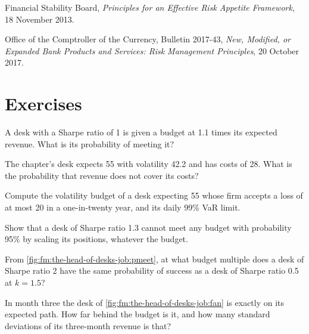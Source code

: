 \begin{omsources}
\item Financial Stability Board, \emph{Principles for an Effective Risk Appetite Framework}, 18 November 2013.
\item Office of the Comptroller of the Currency, Bulletin 2017-43, \emph{New, Modified, or Expanded Bank Products and Services: Risk Management
Principles}, 20 October 2017.
\end{omsources}

\section{Exercises}

\begin{exercise}[$\star$]\label{exo:fm:the-head-of-desks-job:1}
A desk with a Sharpe ratio of 1 is given a budget at 1.1 times its expected revenue. What is its probability of meeting it?
\end{exercise}

\begin{exercise}[$\star$]\label{exo:fm:the-head-of-desks-job:2}
The chapter's desk expects 55 with volatility 42.2 and has costs of 28. What is the probability that revenue does not cover its costs?
\end{exercise}

\begin{exercise}[$\star$]\label{exo:fm:the-head-of-desks-job:3}
Compute the volatility budget of a desk expecting 55 whose firm accepts a loss of at most 20 in a one-in-twenty year, and its daily 99\% VaR limit.
\end{exercise}

\begin{exercise}[$\star\star$]\label{exo:fm:the-head-of-desks-job:4}
Show that a desk of Sharpe ratio 1.3 cannot meet any budget with probability 95\% by scaling its positions, whatever the budget.
\end{exercise}

\begin{exercise}[$\star\star$]\label{exo:fm:the-head-of-desks-job:5}
From \cref{fig:fm:the-head-of-desks-job:pmeet}, at what budget multiple does a desk of Sharpe ratio 2 have the same probability of success as a desk
of Sharpe ratio 0.5 at $k=1.5$?
\end{exercise}

\begin{exercise}[$\star\star$]\label{exo:fm:the-head-of-desks-job:6}
In month three the desk of \cref{fig:fm:the-head-of-desks-job:fan} is exactly on its expected path. How far behind the budget is it, and how many
standard deviations of its three-month revenue is that?
\end{exercise}

